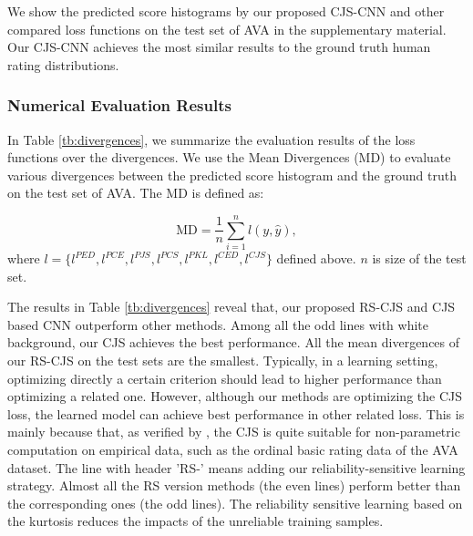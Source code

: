 \documentclass[letterpaper]{article} %
\begin{document}
We show the predicted score histograms by our proposed CJS-CNN and other compared loss functions on the test set of AVA in the supplementary material. Our CJS-CNN achieves the most similar results to the ground truth human rating distributions.










\subsubsection{Numerical Evaluation Results}


In Table \ref{tb:divergences}, we summarize the evaluation results of the loss functions over the divergences. We use the Mean Divergences (MD) to evaluate various divergences between the predicted score histogram and the ground truth on the test set of AVA. The MD is defined as:


\begin{equation}
\text{MD} = \frac{1}{n}\sum_{i=1}^{n}l(y,\hat{y}),
\label{eq:MD}
\end{equation}
where $l=\{l^{PED},l^{PCE},l^{PJS},l^{PCS},l^{PKL},l^{CED},l^{CJS}\}$ defined above. $n$ is size of the test set.






The results in Table \ref{tb:divergences} reveal that, our proposed RS-CJS and CJS based CNN outperform other methods. Among all the odd lines with white background, our CJS achieves the best performance. All the mean divergences of our RS-CJS on the test sets are the smallest. Typically, in a learning setting, optimizing directly a certain criterion should lead to higher performance than optimizing a related one. However, although our methods are optimizing the CJS loss, the learned model can achieve best performance in other related loss. This is mainly because that, as verified by \cite{NguyenECML2015}, the CJS is quite suitable for non-parametric computation on empirical data, such as the ordinal basic rating data of the AVA dataset. The line with header 'RS-' means adding our reliability-sensitive learning strategy. Almost all the RS version methods (the even lines) perform better than the corresponding ones (the odd lines). The reliability sensitive learning based on the kurtosis reduces the impacts of the unreliable training samples.
\end{document}
